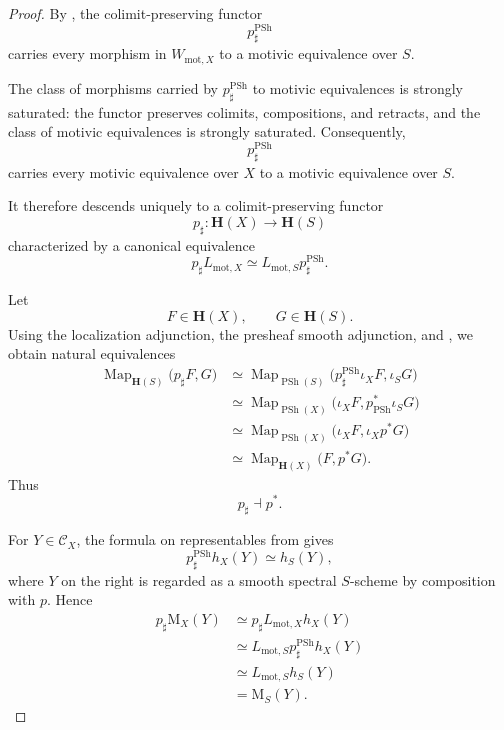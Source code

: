 \begin{proof}
By
,
the colimit-preserving functor
\[
    p^{\operatorname{PSh}}_\sharp
\]
carries every morphism in \(W_{\mathrm{mot},X}\) to a motivic
equivalence over \(S\).

The class of morphisms carried by
\(p^{\operatorname{PSh}}_\sharp\) to motivic equivalences is strongly
saturated: the functor preserves colimits, compositions, and retracts,
and the class of motivic equivalences is strongly saturated.
Consequently,
\[
    p^{\operatorname{PSh}}_\sharp
\]
carries every motivic equivalence over \(X\) to a motivic equivalence
over \(S\).

It therefore descends uniquely to a colimit-preserving functor
\[
    p_\sharp
    \colon
    \mathbf H(X)
    \longrightarrow
    \mathbf H(S)
\]
characterized by a canonical equivalence
\[
    p_\sharp L_{\mathrm{mot},X}
    \simeq
    L_{\mathrm{mot},S}
    p^{\operatorname{PSh}}_\sharp.
\]

Let
\[
    F
    \in
    \mathbf H(X),
    \qquad
    G
    \in
    \mathbf H(S).
\]
Using the localization adjunction, the presheaf smooth adjunction, and
,
we obtain natural equivalences
\[
\begin{aligned}
    \operatorname{Map}_{\mathbf H(S)}
    \bigl(
        p_\sharp F,
        G
    \bigr)
    &\simeq
    \operatorname{Map}_{\operatorname{PSh}(S)}
    \bigl(
        p^{\operatorname{PSh}}_\sharp\iota_XF,
        \iota_SG
    \bigr)
    \\
    &\simeq
    \operatorname{Map}_{\operatorname{PSh}(X)}
    \bigl(
        \iota_XF,
        p^*_{\operatorname{PSh}}\iota_SG
    \bigr)
    \\
    &\simeq
    \operatorname{Map}_{\operatorname{PSh}(X)}
    \bigl(
        \iota_XF,
        \iota_Xp^*G
    \bigr)
    \\
    &\simeq
    \operatorname{Map}_{\mathbf H(X)}
    \bigl(
        F,
        p^*G
    \bigr).
\end{aligned}
\]
Thus
\[
    p_\sharp
    \dashv
    p^*.
\]

For \(Y\in\mathcal C_X\), the formula on representables from
gives
\[
    p^{\operatorname{PSh}}_\sharp h_X(Y)
    \simeq
    h_S(Y),
\]
where \(Y\) on the right is regarded as a smooth spectral \(S\)-scheme
by composition with \(p\). Hence
\[
\begin{aligned}
    p_\sharp\mathrm M_X(Y)
    &\simeq
    p_\sharp L_{\mathrm{mot},X}h_X(Y)
    \\
    &\simeq
    L_{\mathrm{mot},S}
    p^{\operatorname{PSh}}_\sharp h_X(Y)
    \\
    &\simeq
    L_{\mathrm{mot},S}h_S(Y)
    \\
    &=
    \mathrm M_S(Y).
\end{aligned}
\]
\end{proof}

